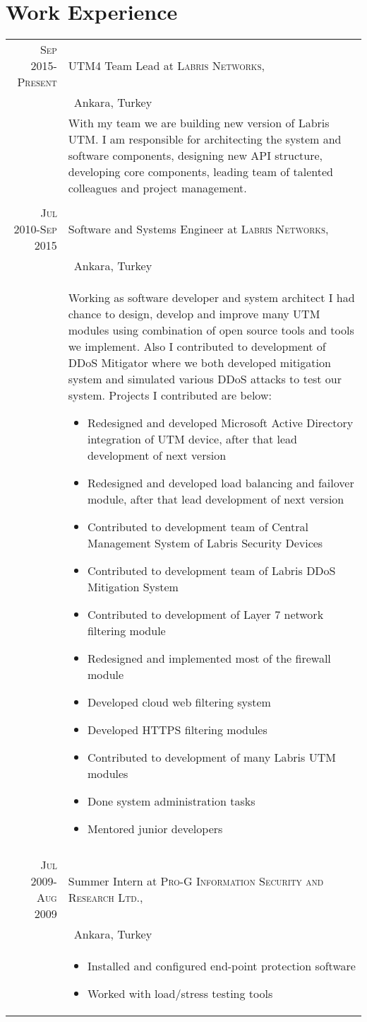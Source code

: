 \documentclass[a4paper,10pt]{article}
\begin{document}
\section{Work Experience}
\begin{tabular}{r|p{11cm}}
 \textsc{Sep 2015-Present} & UTM4 Team Lead at \textsc{Labris Networks}, \\&\ Ankara, Turkey \\&\footnotesize{With my team we are building new version of Labris UTM. I am responsible for architecting the system and
software components, designing new API structure, developing core components, leading team of talented colleagues and project management.}\\\multicolumn{2}{c}{} \\
 \textsc{Jul 2010-Sep 2015} & Software and Systems Engineer at \textsc{Labris Networks}, \\&\ Ankara, Turkey \\&\footnotesize{
 Working as software developer and system architect I had chance to design, develop and improve many UTM modules using combination of open source tools and tools we implement. Also I contributed to development of DDoS Mitigator where we both developed mitigation system and simulated various DDoS attacks to test our system. Projects I contributed are below:
 \begin{itemize}
 \item Redesigned and developed Microsoft Active Directory integration of UTM device, after that lead
development of next version
\item Redesigned and developed load balancing and failover module, after that lead development of next version
\item Contributed to development team of Central Management System of Labris Security Devices
\item Contributed to development team of Labris DDoS Mitigation System
\item Contributed to development of Layer 7 network filtering module
\item Redesigned and implemented most of the firewall module
\item Developed cloud web filtering system
\item Developed HTTPS filtering modules
\item Contributed to development of many Labris UTM modules
\item Done system administration tasks
\item Mentored junior developers
\end{itemize}
}\\\multicolumn{2}{c}{} \\
\textsc{Jul 2009-Aug 2009} & Summer Intern at \textsc{Pro-G Information Security and Research Ltd.}, \\&\ Ankara, Turkey \\&\footnotesize{
\begin{itemize}
\item Installed and configured end-point protection software
\item Worked with load/stress testing tools
\end{itemize}
}
\end{tabular}
\end{document}
